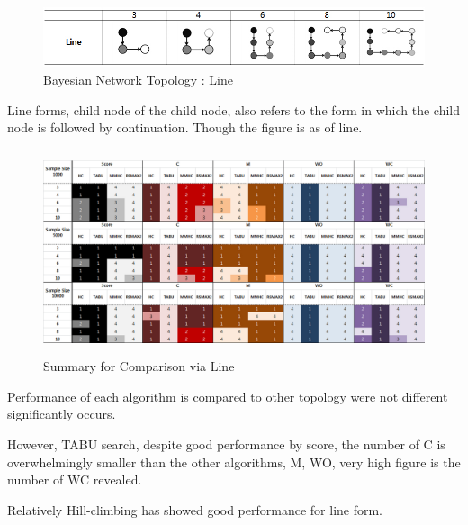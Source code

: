 	\begin{figure}[!bhp]
	\centering
		\includegraphics[height=50pt]{Topologies_Line}
		\caption{Bayesian Network Topology : Line}
	\end{figure}	

	Line forms, child node of the child node, also refers to the form in which the child node is followed by continuation. Though the figure is as of line.

	\begin{figure}[!bhp]
	\centering
		\includegraphics[height=170pt]{Result_Line}
		\caption{Summary for Comparison via Line}
	\end{figure}	
	
Performance of each algorithm is compared to other topology were not different significantly occurs.

However, TABU search, despite good performance by score, the number of C is overwhelmingly smaller than the other algorithms, M, WO, very high figure is the number of WC revealed.

Relatively Hill-climbing has showed good performance for line form.

